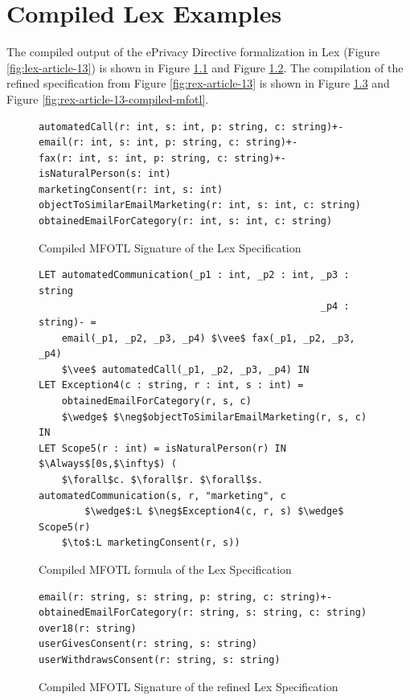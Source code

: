 \chapter{Compiled Lex Examples}

The compiled output of the ePrivacy Directive
formalization in Lex (Figure \ref{fig:lex-article-13})
is shown in Figure \ref{fig:lex-article-13-compiled-signature}
and Figure \ref{fig:lex-article-13-compiled-mfotl}.
The compilation of the refined specification from Figure
\ref{fig:rex-article-13} is shown in Figure
\ref{fig:rex-article-13-compiled-signature}
and Figure \ref{fig:rex-article-13-compiled-mfotl}.

\begin{figure}[H]
    \begin{lstlisting}
automatedCall(r: int, s: int, p: string, c: string)+-
email(r: int, s: int, p: string, c: string)+-
fax(r: int, s: int, p: string, c: string)+-
isNaturalPerson(s: int)
marketingConsent(r: int, s: int)
objectToSimilarEmailMarketing(r: int, s: int, c: string)
obtainedEmailForCategory(r: int, s: int, c: string)        \end{lstlisting}
    \caption{Compiled MFOTL Signature of the Lex Specification
    \label{fig:lex-article-13-compiled-signature}}
\end{figure}

\begin{figure}[H]
    \begin{lstlisting}[mathescape]
LET automatedCommunication(_p1 : int, _p2 : int, _p3 : string
                                                 _p4 : string)- =
    email(_p1, _p2, _p3, _p4) $\vee$ fax(_p1, _p2, _p3, _p4)
    $\vee$ automatedCall(_p1, _p2, _p3, _p4) IN
LET Exception4(c : string, r : int, s : int) =
    obtainedEmailForCategory(r, s, c)
    $\wedge$ $\neg$objectToSimilarEmailMarketing(r, s, c) IN
LET Scope5(r : int) = isNaturalPerson(r) IN
$\Always$[0s,$\infty$) (
    $\forall$c. $\forall$r. $\forall$s. automatedCommunication(s, r, "marketing", c
        $\wedge$:L $\neg$Exception4(c, r, s) $\wedge$ Scope5(r)
    $\to$:L marketingConsent(r, s)) \end{lstlisting}
    \caption{Compiled MFOTL formula of the Lex Specification
    \label{fig:lex-article-13-compiled-mfotl}}
\end{figure}

\begin{figure}[H]
    \begin{lstlisting}
email(r: string, s: string, p: string, c: string)+-
obtainedEmailForCategory(r: string, s: string, c: string)
over18(r: string)
userGivesConsent(r: string, s: string)
userWithdrawsConsent(r: string, s: string) \end{lstlisting}
    \caption{Compiled MFOTL Signature of the refined Lex Specification
    \label{fig:rex-article-13-compiled-signature}}
\end{figure}

